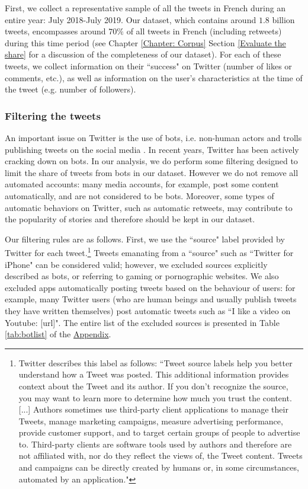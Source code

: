 First, we collect a representative sample of all the tweets in French during an entire year: July 2018-July 2019. Our dataset, which contains around $1.8$ billion tweets, encompasses around $70\%$ of all tweets in French (including retweets) during this time period (see Chapter \ref{Chapter: Corpus} Section \ref{Evaluate the share} for a discussion of the completeness of our dataset). For each of these tweets, we collect information on their ``success" on Twitter (number of likes or comments, etc.), as well as information on the user's characteristics at the time of the tweet (e.g. number of followers).

\subsubsection{Filtering the tweets}

An important issue on Twitter is the use of bots, i.e. non-human actors and trolls publishing tweets on the social media  \citep[see e.g.][]{Gorodnichenkoetal2018}. In recent years, Twitter has been actively cracking down on bots. In our analysis, we do perform some filtering designed to limit the share of tweets from bots in our dataset. However we do not remove all automated accounts: many media accounts, for example, post some content automatically, and are not considered to be bots. Moreover, some types of automatic behaviors on Twitter, such as automatic retweets, may contribute to the popularity of stories and therefore should be kept in our dataset.

Our filtering rules are as follows. First, we use the ``source" label provided by Twitter for each tweet.\footnote{Twitter describes this label as follows: ``Tweet source labels help you better understand how a Tweet was posted. This additional information provides context about the Tweet and its author. If you don’t recognize the source, you may want to learn more to determine how much you trust the content. [...] Authors sometimes use third-party client applications to manage their Tweets, manage marketing campaigns, measure advertising performance, provide customer support, and to target certain groups of people to advertise to. Third-party clients are software tools used by authors and therefore are not affiliated with, nor do they reflect the views of, the Tweet content. Tweets and campaigns can be directly created by humans or, in some circumstances, automated by an application."} 
Tweets emanating from a ``source" such as ``Twitter for iPhone" can be considered valid; however, we excluded sources explicitly described as bots, or referring to gaming or pornographic websites. We also excluded apps automatically posting tweets based on the behaviour of users: for example, many Twitter users (who are human beings and usually publish tweets they have written themselves) post automatic tweets such as ``I like a video on Youtube: [url]". The entire list of the excluded sources is presented in Table \ref{tab:botlist} of the \hyperlink{ref:Appendix}{Appendix}. 

